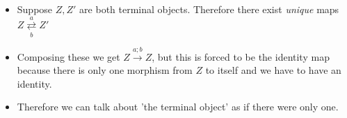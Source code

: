 \begin{itemize}
    \item  Suppose $Z,Z'$ are both terminal objects. Therefore there exist \emph{unique} maps $Z \overset{a}{\underset{b}{\rightleftarrows}}Z'$
    \item Composing these we get $Z \xrightarrow{a;b} Z$, but this is forced to be the identity map because there is only one morphism from $Z$ to itself and we have to have an identity.
    \item Therefore we can talk about 'the terminal object' as if there were only one.
  \end{itemize}
